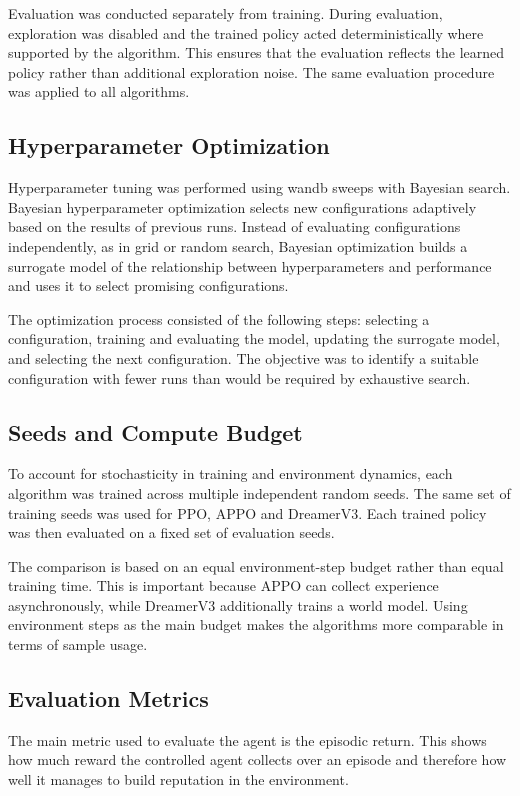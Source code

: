 \documentclass[english,bachelor]{hsluthesis}
\begin{document}
Evaluation was conducted separately from training. During evaluation, exploration was disabled and the trained policy acted deterministically where supported by the algorithm. This ensures that the evaluation reflects the learned policy rather than additional exploration noise. The same evaluation procedure was applied to all algorithms.

\subsection{Hyperparameter Optimization}

Hyperparameter tuning was performed using \gls{wandb} sweeps with Bayesian search. Bayesian hyperparameter optimization selects new configurations adaptively based on the results of previous runs. Instead of evaluating configurations independently, as in grid or random search, Bayesian optimization builds a surrogate model of the relationship between hyperparameters and performance and uses it to select promising configurations.

The optimization process consisted of the following steps: selecting a configuration, training and evaluating the model, updating the surrogate model, and selecting the next configuration. The objective was to identify a suitable configuration with fewer runs than would be required by exhaustive search.

\subsection{Seeds and Compute Budget}

To account for stochasticity in training and environment dynamics, each algorithm was trained across multiple independent random seeds. The same set of training seeds was used for PPO, APPO and DreamerV3. Each trained policy was then evaluated on a fixed set of evaluation seeds.

The comparison is based on an equal environment-step budget rather than equal training time. This is important because APPO can collect experience asynchronously, while DreamerV3 additionally trains a world model. Using environment steps as the main budget makes the algorithms more comparable in terms of sample usage.

\subsection{Evaluation Metrics}

The main metric used to evaluate the agent is the episodic return. This shows how much reward the controlled agent collects over an episode and therefore how well it manages to build reputation in the environment.
\end{document}
